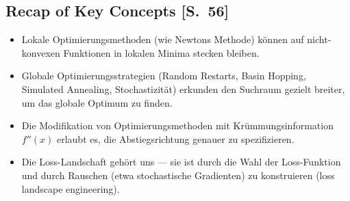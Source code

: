 \subsection{Recap of Key Concepts [S.~56]}
\begin{itemize}[itemsep=2pt]
  \item Lokale Optimierungsmethoden (wie Newtons Methode) können auf nicht-konvexen
        Funktionen in lokalen Minima stecken bleiben.
  \item Globale Optimierungsstrategien (Random Restarts, Basin Hopping, Simulated
        Annealing, Stochastizität) erkunden den Suchraum gezielt breiter, um das
        globale Optimum zu finden.
  \item Die Modifikation von Optimierungsmethoden mit Krümmungsinformation $f''(x)$
        erlaubt es, die Abstiegsrichtung genauer zu spezifizieren.
  \item Die Loss-Landschaft \glqq gehört uns\grqq{} --- sie ist durch die Wahl der
        Loss-Funktion und durch Rauschen (etwa stochastische Gradienten) zu
        konstruieren (loss landscape engineering).
\end{itemize}

